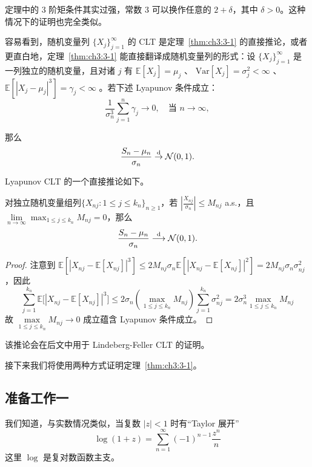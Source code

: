\begin{remark}
定理中的 3 阶矩条件其实过强，常数 3 可以换作任意的 $2+\delta$，其中 $\delta>0$。这种情况下的证明也完全类似。
\end{remark}

容易看到，随机变量列 $\{X_j\}_{j=1}^\infty$ 的 CLT 是定理~\ref{thm:ch3:3-1} 的直接推论，或者更直白地，定理~\ref{thm:ch3:3-1} 能直接翻译成随机变量列的形式：设 $\{X_j\}_{j=1}^\infty$ 是一列独立的随机变量，且对诸 $j$ 有 $\mathbb{E}[X_j]=\mu_j$ 、 $\mathrm{Var}[X_j]=\sigma_j^2<\infty$ 、 $\mathbb{E}[|X_j-\mu_j|^3]=\gamma_j<\infty$ 。若下述 Lyapunov 条件成立：
\[
\frac1{\sigma_n^3}\sum_{j=1}^n\gamma_j\to 0,\quad \text{当 } n \to \infty,
\]

那么
\[
\frac{S_n - \mu_n}{\sigma_n} \overset{\rm d}\to \mathcal{N}(0, 1).
\]

Lyapunov CLT 的一个直接推论如下。

\begin{corollary}

\label{cor:ch3:3-2}对独立随机变量组列$\{X_{nj} : 1 \leq j \leq k_n\}_{n \geq 1}$，若 $\left|\frac{X_{nj}}{\sigma_{n}}\right|\le M_{nj}$ a.s.，且 $\lim\limits_{n\to\infty}\max_{1\le j\le k_n}M_{nj}=0$，那么
\[
\frac{S_n-\mu_n}{\sigma_n}\overset{\rm d}\longrightarrow\mathcal N(0,1).
\]

\end{corollary}

\begin{proof}

注意到 $\mathbb{E}[|X_{nj}-\mathbb{E}[X_{nj}]|^3]\le 2M_{nj}\sigma_n\mathbb{E}[|X_{nj}-\mathbb{E}[X_{nj}]|^2]=2M_{nj}\sigma_n\sigma_{nj}^2$ ，因此 \[ \sum_{j=1}^{k_n}\mathbb{E}\big[|X_{nj}-\mathbb{E}[X_{nj}]|^3\big]\le 2\sigma_n\left(\max_{1\le j\le k_n}M_{nj}\right)\sum_{j=1}^{k_n}\sigma_{nj}^2=2\sigma_n^3\max_{1\le j\le k_n}M_{nj} \]故 $\max\limits_{1\le j\le k_n}M_{nj}\to 0$ 成立蕴含 Lyapunov 条件成立。

\end{proof}

该推论会在后文中用于 Lindeberg-Feller CLT 的证明。

接下来我们将使用两种方式证明定理~\ref{thm:ch3:3-1}。

\subsection{准备工作一}

我们知道，与实数情况类似，当复数 $|z|<1$ 时有``Taylor 展开''
\[\log(1+z) = \sum_{n=1}^{\infty} (-1)^{n-1} \frac{z^n}{n}\]
这里 $\log$ 是复对数函数主支。

